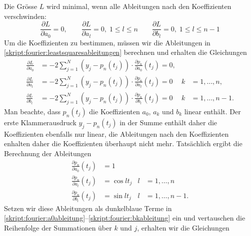 Die Grösse $L$ wird minimal, wenn alle Ableitungen nach den Koeffizienten
verschwinden:
\begin{equation}
\frac{\partial L}{\partial a_0}=0,
\qquad
\frac{\partial L}{\partial a_l}=0, \;{1\le l\le n}
\qquad
\frac{\partial L}{\partial b_l}=0, \;{1\le l\le n-1}
\label{skript:fourier:leastsquaresableitungen}
\end{equation}
Um die Koeffizienten zu bestimmen, müssen wir die Ableitungen in
\eqref{skript:fourier:leastsquaresableitungen}
berechnen und erhalten die Gleichungen
\begin{align}
\frac{\partial L}{\partial a_0}
&=
-2 \sum_{j=1}^N (y_j-p_n(t_j))\cdot \frac{\partial p_n}{\partial a_0}(t_j)=0,
&&
\label{skript:fourier:a0ableitung}
\\
\frac{\partial L}{\partial a_l}
&=
-2 \sum_{j=1}^N (y_j-p_n(t_j))\cdot \frac{\partial p_n}{\partial a_l}(t_j)=0
&k&=1,\dots,n,
\label{skript:fourier:akableitung}
\\
\frac{\partial L}{\partial b_l}
&=
-2 \sum_{j=1}^N (y_j-p_n(t_j))\cdot \frac{\partial p_n}{\partial b_l}(t_j)=0
&k&=1,\dots,n-1.
\label{skript:fourier:bkableitung}
\end{align}
Man beachte, dass $p_n(t_j)$ die Koeffizienten $a_0$, $a_k$ und $b_k$
linear enthält.
Der erste Klammerausdruck $y_j-p_n(t_j)$ in der Summe enthält daher die
Koeffizienten ebenfalls nur linear, die Ableitungen nach den Koeffizienten
enhalten daher die Koeffizienten überhaupt nicht mehr.
Tatsächlich ergibt die Berechnung der Ableitungen
\begin{align}
\frac{\partial p_n}{\partial a_0}(t_j)
&=
1
&&
\label{skript:fourier:a0abl}
\\
\frac{\partial p_n}{\partial a_l}(t_j)
&=
\cos lt_j
&l&=1,\dots,n
\label{skript:fourier:akabl}
\\
\frac{\partial p_n}{\partial b_l}(t_j)
&=
\sin lt_j
&l&=1,\dots,n-1.
\label{skript:fourier:bkabl}
\end{align}
%
Setzen wir diese Ableitungen als {\color{darkblue}dunkelblaue} Terme in
\eqref{skript:fourier:a0ableitung}--\eqref{skript:fourier:bkableitung} ein
und vertauschen die Reihenfolge der Summationen über $k$ und $j$,
erhalten wir die Gleichungen
%
